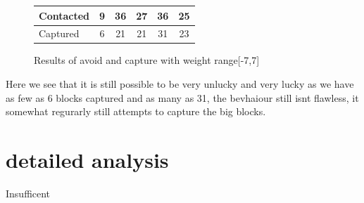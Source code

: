 \documentclass[12pt, a4paper]{article}
\begin{document}
\begin{figure}[H]
	\begin{center}
		\begin{tabular}{l | c | c |c |c |c }
		 Contacted& 9 & 36 & 27 & 36 & 25\\ \hline
		 Captured & 6 & 21 & 21 & 31 & 23\\
		 
		\end{tabular}
	\end{center}
	\caption{Results of avoid and capture with weight range[-7,7]}
\end{figure}

Here we see that it is still possible to be very unlucky and very lucky as we have as few as 6 blocks captured and as many as 31, the bevhaiour still isnt flawless, it somewhat regurarly still attempts to capture the big blocks. 

\section{detailed analysis}
Insufficent 
\end{document}
